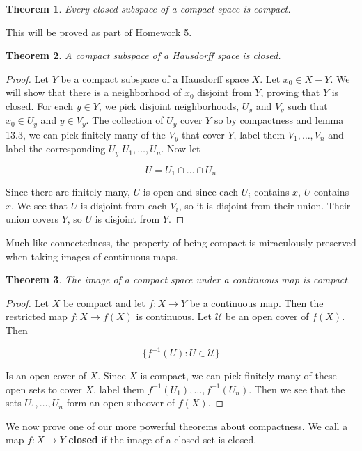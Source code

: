\documentclass[a4paper]{article}
\newtheorem{theorem}{Theorem}
\numberwithin{theorem}{section}
\begin{document}
\begin{theorem} \label{closed}
Every closed subspace of a compact space is compact.
\end{theorem}
This will be proved as part of Homework 5.

\begin{theorem} \label{haus}
A compact subspace of a Hausdorff space is closed.
\end{theorem}

\begin{proof}
Let $Y$ be a compact subspace of a Hausdorff space $X$. Let $x_0 \in X - Y$. We will show that there is a neighborhood of $x_0$ disjoint from $Y$, proving that $Y$ is closed. For each $y \in Y$, we pick disjoint neighborhoods, $U_y$ and $V_y$ such that $x_0 \in U_y$ and $y \in V_y$. The collection of $U_y$ cover $Y$ so by compactness and lemma 13.3, we can pick finitely many of the $V_y$ that cover $Y$, label them $V_1,\dots,V_n$ and label the corresponding $U_y$ $U_1,\dots,U_n$. Now let 

$$ U = U_1 \cap \dots \cap U_n $$

Since there are finitely many, $U$ is open and since each $U_i$ contains $x$, $U$ contains $x$. We see that $U$ is disjoint from each $V_i$, so it is disjoint from their union. Their union covers $Y$, so $U$ is disjoint from $Y$.
\end{proof}

Much like connectedness, the property of being compact is miraculously preserved when taking images of continuous maps.

\begin{theorem} \label{imag}
The image of a compact space under a continuous map is compact.
\end{theorem}
\begin{proof}
Let $X$ be compact and let $f: X \rightarrow Y$ be a continuous map. Then the restricted map $f: X \rightarrow f(X)$ is continuous. Let $\mathcal{U}$ be an open cover of $f(X)$. Then 

$$ \{f^{-1}(U) : U \in \mathcal{U}\} $$

Is an open cover of $X$. Since $X$ is compact, we can pick finitely many of these open sets to cover $X$, label them $f^{-1}(U_1), \dots, f^{-1}(U_n)$. Then we see that the sets $U_1,\dots,U_n$ form an open subcover of $f(X)$.
\end{proof}

We now prove one of our more powerful theorems about compactness. We call a map $f: X \rightarrow Y$ \textbf{closed} if the image of a closed set is closed.
\end{document}
